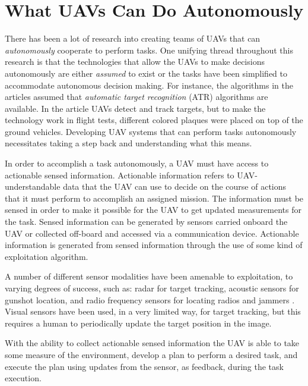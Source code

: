 \documentclass[letterpaper, 12 pt, conference]{ieeeconf}  %
\theoremstyle{definition}
\begin{document}
\section{What UAVs Can Do Autonomously\label{sec:Autonomy}}
There has been a lot of research into creating teams of UAVs that can \emph{autonomously} cooperate to perform tasks\cite{Chandler:2001a,Richards:2002,Rasmussen:2004b,RasmussenShima:2007,ShimaSchumacher:2008,How:2009}. One unifying thread throughout this research is that the technologies that allow the UAVs to make decisions autonomously are either \emph{assumed} to exist or the tasks have been simplified to accommodate autonomous decision making. For instance, the algorithms in the articles \cite{Chandler:2001a,Rasmussen:2004b,RasmussenShima:2007,ShimaSchumacher:2008} assumed that \emph{automatic target recognition} (ATR) algorithms are available. In the article \cite{How:2009} UAVs detect and track targets, but to make the technology work in flight tests, different colored plaques were placed on top of the ground vehicles. Developing UAV systems that can perform tasks autonomously necessitates taking a step back and understanding what this means.

In order to accomplish a task autonomously, a UAV must have access to actionable sensed information. Actionable information refers to UAV-understandable data that the UAV can use to decide on the course of actions that it must perform to accomplish an assigned mission. The information must be sensed in order to make it possible for the UAV to get updated measurements for the task. Sensed information can be generated by sensors carried onboard the UAV or collected off-board and accessed via a communication device. Actionable information is generated from sensed information through the use of some kind of exploitation algorithm.

A number of different sensor modalities have been amenable to exploitation, to varying degrees of success, such as: radar for target tracking\cite{kingstonACC05}, acoustic sensors for gunshot location, and radio frequency sensors for locating radios and jammers\cite{wang2010jamming} . Visual sensors have been used, in a very limited way, for target tracking, but this requires a human to periodically update the target position in the image.

With the ability to collect actionable sensed information the UAV is able to take some measure of the environment, develop a plan to perform a desired task, and execute the plan using updates from the sensor, as feedback, during the task execution. 
\end{document}
